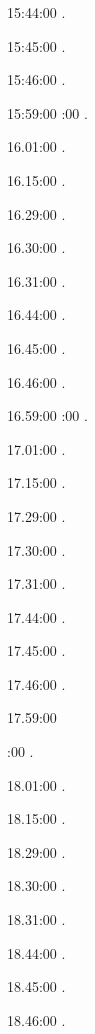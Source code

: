 15:44:00 .

15:45:00 .

15:46:00 .

15:59:00 
:00 .

16.01:00 . 

16.15:00 . 

16.29:00 . 

16.30:00 .

16.31:00 .

16.44:00 .

16.45:00 .

16.46:00 .

16.59:00 
:00 .

17.01:00 . 

17.15:00 . 

17.29:00 . 

17.30:00 .

17.31:00 .

17.44:00 .

17.45:00 .

17.46:00 .

17.59:00 

:00 .

18.01:00 . 

18.15:00 . 

18.29:00 . 

18.30:00 .

18.31:00 .

18.44:00 .

18.45:00 .

18.46:00 .

